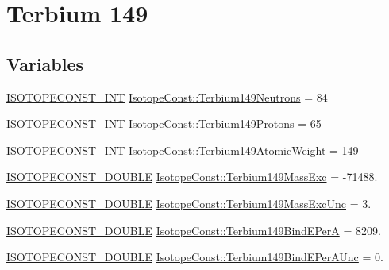 \hypertarget{group___isotope_const-_terbium-_tb149}{}\section{Terbium 149}
\label{group___isotope_const-_terbium-_tb149}
\subsection*{Variables}
\begin{DoxyCompactItemize}
\item 
\mbox{\hyperlink{group___isotope_const-_macros_ga5f18360b3e99483a35c32d789e62621c}{I\+S\+O\+T\+O\+P\+E\+C\+O\+N\+S\+T\+\_\+\+I\+NT}} \mbox{\hyperlink{group___isotope_const-_terbium-_tb149_gab9f3a2b7d43120c4cc6957225080bde9}{Isotope\+Const\+::\+Terbium149\+Neutrons}} = 84
\item 
\mbox{\hyperlink{group___isotope_const-_macros_ga5f18360b3e99483a35c32d789e62621c}{I\+S\+O\+T\+O\+P\+E\+C\+O\+N\+S\+T\+\_\+\+I\+NT}} \mbox{\hyperlink{group___isotope_const-_terbium-_tb149_gaa6e3de5e075a929481644d1d418918e1}{Isotope\+Const\+::\+Terbium149\+Protons}} = 65
\item 
\mbox{\hyperlink{group___isotope_const-_macros_ga5f18360b3e99483a35c32d789e62621c}{I\+S\+O\+T\+O\+P\+E\+C\+O\+N\+S\+T\+\_\+\+I\+NT}} \mbox{\hyperlink{group___isotope_const-_terbium-_tb149_ga4275291eb122d7176299fe2651d9455d}{Isotope\+Const\+::\+Terbium149\+Atomic\+Weight}} = 149
\item 
\mbox{\hyperlink{group___isotope_const-_macros_ga8f45a7272ce02c0b4c65c44636ed719a}{I\+S\+O\+T\+O\+P\+E\+C\+O\+N\+S\+T\+\_\+\+D\+O\+U\+B\+LE}} \mbox{\hyperlink{group___isotope_const-_terbium-_tb149_ga9b474c579164c772ffae2aac77b83073}{Isotope\+Const\+::\+Terbium149\+Mass\+Exc}} = -\/71488.
\item 
\mbox{\hyperlink{group___isotope_const-_macros_ga8f45a7272ce02c0b4c65c44636ed719a}{I\+S\+O\+T\+O\+P\+E\+C\+O\+N\+S\+T\+\_\+\+D\+O\+U\+B\+LE}} \mbox{\hyperlink{group___isotope_const-_terbium-_tb149_gae5df76b1262175c7e67d883fdddbdeea}{Isotope\+Const\+::\+Terbium149\+Mass\+Exc\+Unc}} = 3.
\item 
\mbox{\hyperlink{group___isotope_const-_macros_ga8f45a7272ce02c0b4c65c44636ed719a}{I\+S\+O\+T\+O\+P\+E\+C\+O\+N\+S\+T\+\_\+\+D\+O\+U\+B\+LE}} \mbox{\hyperlink{group___isotope_const-_terbium-_tb149_ga55f8709123639ef121be24d1371c0225}{Isotope\+Const\+::\+Terbium149\+Bind\+E\+PerA}} = 8209.
\item 
\mbox{\hyperlink{group___isotope_const-_macros_ga8f45a7272ce02c0b4c65c44636ed719a}{I\+S\+O\+T\+O\+P\+E\+C\+O\+N\+S\+T\+\_\+\+D\+O\+U\+B\+LE}} \mbox{\hyperlink{group___isotope_const-_terbium-_tb149_ga15e89369d9ccf8b76b25ffe7889d0930}{Isotope\+Const\+::\+Terbium149\+Bind\+E\+Per\+A\+Unc}} = 0.

\end{DoxyCompactItemize}
